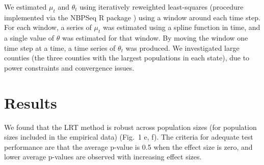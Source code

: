 \documentclass[10pt,letterpaper]{article}
\begin{document}
We estimated \begin{math}\mu_t\end{math} and \begin{math}\theta_t\end{math} using iteratively reweighted least-squares (procedure implemented via the NBPSeq R package \cite{NBPSeq}) using a window around each time step.
For each window, a series of \begin{math}\mu_t\end{math} was estimated using a spline function in time, and a single value of \begin{math}\theta\end{math} was estimated for that window. 
By moving the window one time step at a time, a time series of \begin{math}\theta_t\end{math} was produced. We investigated large counties (the three counties with the largest populations in each state), due to power constraints and convergence issues.

\section*{Results}
We found that the LRT method is robust across population sizes (for population sizes included in the empirical data) (Fig.\ 1 e, f).
The criteria for adequate test performance are that the average p-value is 0.5 when the effect size is zero, and lower average p-values are observed with increasing effect sizes. 
\end{document}
